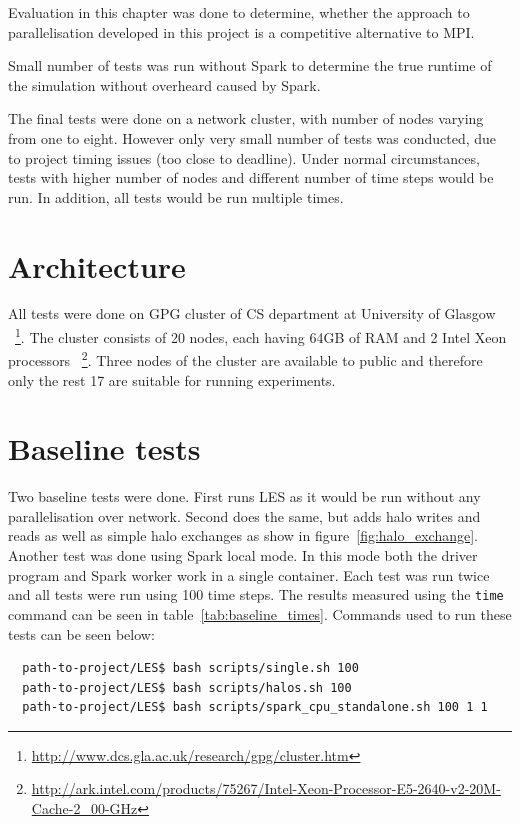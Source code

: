 \documentclass{l4proj}
\begin{document}
Evaluation in this chapter was done to determine, whether the approach to parallelisation
developed in this project is a competitive alternative to MPI.

Small number of tests was run without Spark to determine the true runtime of
the simulation without overheard caused by Spark.

The final tests were done on a network cluster, with number of nodes varying from one
to eight. However only very small number of tests was conducted, due to 
project timing issues (too close to deadline). Under normal circumstances,
tests with higher number of nodes and different number of time steps would be run.
In addition, all tests would be run multiple times.

\section{Architecture}

All tests were done on GPG cluster of CS department at University of Glasgow
~\footnote{\url{http://www.dcs.gla.ac.uk/research/gpg/cluster.htm}}.
The cluster consists of 20 nodes, each having 64GB of RAM and 2 Intel Xeon processors
~\footnote{\url{http://ark.intel.com/products/75267/Intel-Xeon-Processor-E5-2640-v2-20M-Cache-2_00-GHz}}.
Three nodes of the cluster are available to public and therefore only the rest 17 are
suitable for running experiments.

\section{Baseline tests}

Two baseline tests were done. First runs LES as it would be run without any
parallelisation over network. Second does the same, but adds halo writes and reads
as well as simple halo exchanges as show in figure~\ref{fig:halo_exchange}.
Another test was done using Spark local mode. In this mode both the driver 
program and Spark worker work in a single container. Each test was run twice and 
all tests were run using 100 time steps. The results measured using the \texttt{time} command
can be seen in table~\ref{tab:baseline_times}. Commands used to run these tests can be seen below:
\begin{verbatim}
  path-to-project/LES$ bash scripts/single.sh 100
  path-to-project/LES$ bash scripts/halos.sh 100
  path-to-project/LES$ bash scripts/spark_cpu_standalone.sh 100 1 1
\end{verbatim}
\end{document}
